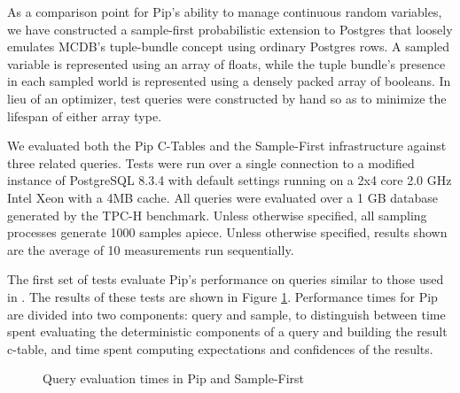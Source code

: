 As a comparison point for Pip's ability to manage continuous random variables, we have constructed a sample-first probabilistic extension to Postgres that loosely emulates MCDB's tuple-bundle concept using ordinary Postgres rows.  A sampled variable is represented using an array of floats, while the tuple bundle's presence in each sampled world is represented using a densely packed array of booleans.  In lieu of an optimizer, test queries were constructed by hand so as to minimize the lifespan of either array type.

We evaluated both the Pip C-Tables and the Sample-First infrastructure against three related queries.  Tests were run over a single connection to a modified instance of PostgreSQL 8.3.4 with default settings running on a 2x4 core 2.0 GHz Intel Xeon with a 4MB cache.  All queries were evaluated over a 1 GB database generated by the TPC-H benchmark.  Unless otherwise specified, all sampling processes generate 1000 samples apiece.  Unless otherwise specified, results shown are the average of 10 measurements run sequentially.  

The first set of tests evaluate Pip's performance on queries similar to those used in \cite{MCDB}.  The results of these tests are shown in Figure \ref{fig:querytimings}.  Performance times for Pip are divided into two components: query and sample, to distinguish between time spent evaluating the deterministic components of a query and building the result c-table, and time spent computing expectations and confidences of the results.

\begin{figure}
\begin{center}
\caption{Query evaluation times in Pip and Sample-First}
\label{fig:querytimings}
\end{center}
\end{figure}

